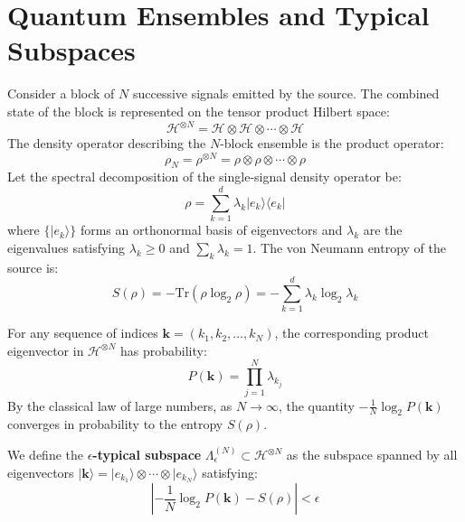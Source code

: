 \documentclass[twocolumn,10pt,letterpaper]{article}
\begin{document}
\section{Quantum Ensembles and Typical Subspaces}
Consider a block of $N$ successive signals emitted by the source. The combined state of the block is represented on the tensor product Hilbert space:
\begin{equation}
\mathcal{H}^{\otimes N} = \mathcal{H} \otimes \mathcal{H} \otimes \cdots \otimes \mathcal{H}
\end{equation}
The density operator describing the $N$-block ensemble is the product operator:
\begin{equation}
\rho_N = \rho^{\otimes N} = \rho \otimes \rho \otimes \cdots \otimes \rho
\end{equation}
Let the spectral decomposition of the single-signal density operator be:
\begin{equation}
\rho = \sum_{k=1}^d \lambda_k |e_k\rangle \langle e_k|
\end{equation}
where $\{|e_k\rangle\}$ forms an orthonormal basis of eigenvectors and $\lambda_k$ are the eigenvalues satisfying $\lambda_k \ge 0$ and $\sum_k \lambda_k = 1$. The von Neumann entropy of the source is:
\begin{equation}
S(\rho) = -\mathrm{Tr}(\rho \log_2 \rho) = -\sum_{k=1}^d \lambda_k \log_2 \lambda_k
\end{equation}

For any sequence of indices $\mathbf{k} = (k_1, k_2, \dots, k_N)$, the corresponding product eigenvector in $\mathcal{H}^{\otimes N}$ has probability:
\begin{equation}
P(\mathbf{k}) = \prod_{j=1}^N \lambda_{k_j}
\end{equation}
By the classical law of large numbers, as $N \to \infty$, the quantity $-\frac{1}{N} \log_2 P(\mathbf{k})$ converges in probability to the entropy $S(\rho)$. 

We define the \textbf{$\epsilon$-typical subspace} $\Lambda_\epsilon^{(N)} \subset \mathcal{H}^{\otimes N}$ as the subspace spanned by all eigenvectors $|\mathbf{k}\rangle = |e_{k_1}\rangle \otimes \cdots \otimes |e_{k_N}\rangle$ satisfying:
\begin{equation}
\left| -\frac{1}{N} \log_2 P(\mathbf{k}) - S(\rho) \right| < \epsilon
\end{equation}
\end{document}
